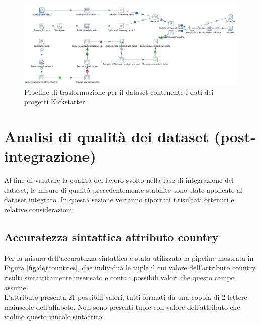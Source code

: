 \begin{figure}[p!]
	\centering
	\includegraphics[angle=90,origin=c,height=1.1\linewidth]{images/transformation_complete}
	\caption{Pipeline di trasformazione per il dataset contenente i dati dei progetti Kickstarter}
	\label{fig:transformationcomplete}
\end{figure}

\newpage
\section{Analisi di qualità dei dataset (post-integrazione)}
Al fine di valutare la qualità del lavoro svolto nella fase di integrazione del dataset, le misure di qualità precedentemente stabilite sono state applicate al dataset integrato. In questa sezione verranno riportati i risultati ottenuti e relative considerazioni.

\subsection{Accuratezza sintattica attributo country}
Per la misura dell'accuratezza sintattica è stata utilizzata la pipeline mostrata in Figura \ref{fig:dqtcountries}, che individua le tuple il cui valore dell'attributo country risulti sintatticamente insensato e conta i possibili valori che questo campo assume.\\
L'attributo presenta 21 possibili valori, tutti formati da una coppia di 2 lettere maiuscole dell'alfabeto. Non sono presenti tuple con valore dell'attributo che violino questo vincolo sintattico.

